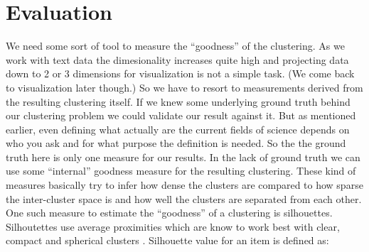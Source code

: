 \chapter{Evaluation}
\label{chapter:evaluation}

We need some sort of tool to measure the ``goodness'' of the 
clustering. As we work with text data the dimesionality increases 
quite high and projecting data down to 2 or 3 dimensions for 
visualization is not a simple task. (We come back to visualization 
later though.)
So we have to resort to measurements derived from the 
resulting clustering itself. If we knew some underlying ground 
truth behind our clustering problem we could validate our result 
against it. But as mentioned earlier, even defining what actually 
are the current fields of science depends on who you ask and for 
what purpose the definition is needed. So the the ground truth 
here is only one measure for our results.
In the lack of ground truth we can use some ``internal'' goodness 
measure for the resulting clustering. These kind of measures 
basically try to infer how dense the clusters are compared to how 
sparse the inter-cluster space is and how well the clusters are 
separated from each other.
One such measure to estimate the ``goodness'' of a clustering is 
silhouettes. Silhoutettes use average proximities which are know 
to work best with clear, compact and spherical clusters 
\cite{rousseeuw_silhouettes:_1987}. Silhouette value for an item 
is defined as:

